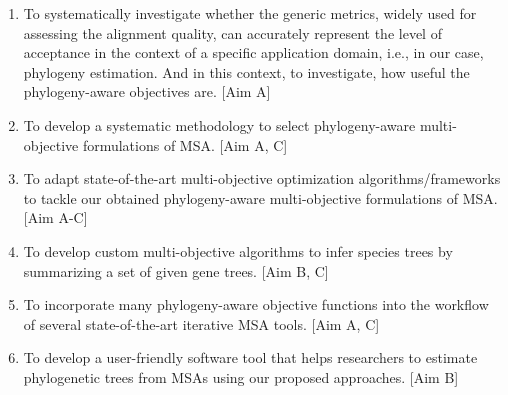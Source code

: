 \begin{enumerate}
\item To systematically investigate whether the generic metrics, widely used for assessing the alignment quality, can accurately represent the level of acceptance in the context of a specific application domain, i.e., in our case, phylogeny estimation. And in this context, to investigate, how useful the phylogeny-aware objectives are. [Aim A]

\item To develop a systematic methodology to select phylogeny-aware multi-objective formulations of MSA. [Aim A, C]

\item To adapt state-of-the-art multi-objective optimization algorithms/frameworks to tackle our obtained phylogeny-aware multi-objective formulations of MSA. [Aim A-C]

\item To develop custom multi-objective algorithms to infer species trees by summarizing a set of given gene trees. [Aim B, C]

\item To incorporate many phylogeny-aware objective functions into the workflow of several state-of-the-art iterative MSA tools. [Aim A, C]

\item To develop a user-friendly software tool that helps researchers to estimate phylogenetic trees from MSAs using our proposed approaches. [Aim B]
\end{enumerate}

\begin{comment}

By accomplishing our objectives mentioned above we expect to obtain the following outcomes.

(i) A systematic methodology for choosing an appropriate multi-objective formulation of MSA considering the application domain (i.e., in our case phylogeny estimation). [Aim A, C]

(ii) Several phylogeny-aware multi-objective formulations of MSA. [Aim A, C]

(iii) Some robust methods for alignment-based phylogeny estimation stemming from the hybridization of state-of-the-art iterative MSA methods and many-objective optimization strategies. [Aim A-C]

(iv) Some customized multi-objective optimization algorithms for species tree estimation by summarizing a set of given gene trees. [Aim B, C]

(v) As a by-product of the above outcome, new MO frameworks may be proposed that could be of independent interest. [Aim C]

(vi) Open-source software tools for estimating phylogenetic trees from MSAs using our proposed approaches. [Aim B]

(vii) A scientific discourse along with a comparative analysis on the overall efficacy of the concept of domain-specific measures in general and phylogeny-awareness in particular. [Aim A]
\end{comment}

